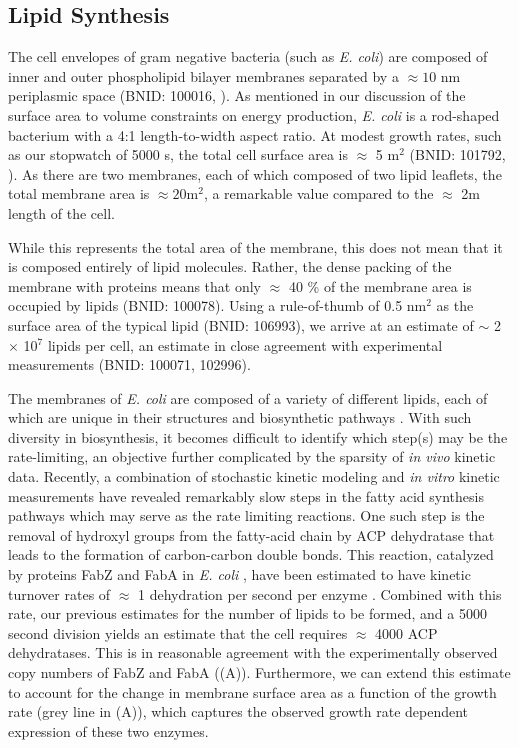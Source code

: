 \subsection{Lipid Synthesis}
The cell envelopes of gram negative bacteria (such as \textit{E. coli}) are
composed of inner and outer phospholipid bilayer membranes separated by a
$\approx 10$ nm periplasmic space (BNID: 100016, \cite{milo2010}). As mentioned
in our discussion of the surface area to volume constraints on energy
production, \textit{E. coli} is a rod-shaped bacterium with a 4:1
length-to-width aspect ratio. At modest growth rates, such as our stopwatch of
5000 s, the total cell surface area is $\approx$ 5 \textmu m$^2$ (BNID: 101792,
\cite{milo2010}). As there are two membranes, each of which composed of two
lipid leaflets, the total membrane area is $\approx 20$\textmu m$^2$, a
remarkable value compared to the $\approx$ 2\textmu m length of the cell.

While this represents the total area of the membrane, this does not mean that it
is composed entirely of lipid molecules. Rather, the dense packing of the
membrane with proteins means that only $\approx$ 40 \% of the membrane area is
occupied by lipids (BNID: 100078). Using a rule-of-thumb of 0.5
nm$^2$ as the surface area of the typical lipid (BNID: 106993),
we arrive at an estimate of $\sim$ 2 $\times$ 10$^7$ lipids per cell, an
estimate in close agreement with experimental measurements (BNID: 100071,
102996).

The membranes of \textit{E. coli} are composed of a variety of different lipids,
each of which are unique in their structures and biosynthetic pathways
\citep{sohlenkamp2016}. With such diversity in biosynthesis, it becomes
difficult to identify which step(s) may be the rate-limiting, an objective further complicated by the sparsity of \textit{in vivo} kinetic data.
Recently, a combination of stochastic kinetic modeling \citep{ruppe2018} and
\textit{in vitro} kinetic measurements \citep{ranganathan2012, yu2011} have
revealed remarkably slow steps in the fatty acid synthesis pathways which may
serve as the rate limiting reactions. One such step is the removal of hydroxyl
groups from the fatty-acid chain by ACP dehydratase that leads to the formation of
carbon-carbon double bonds. This reaction, catalyzed by proteins FabZ and
FabA in \textit{E. coli} \citep{yu2011}, have been estimated to have kinetic
turnover rates of $\approx$ 1 dehydration per second per enzyme
\citep{ruppe2018}. Combined with this rate, our previous estimates for the
number of lipids to be formed, and a 5000 second division yields an estimate
that the cell requires $\approx$ 4000 ACP dehydratases. This is in
reasonable agreement with the experimentally observed copy numbers of FabZ and
FabA ((A)). Furthermore, we can extend this estimate to
account for the change in membrane surface area as a function of the growth rate
(grey line in (A)), which captures the observed growth rate
dependent expression of these two enzymes.

